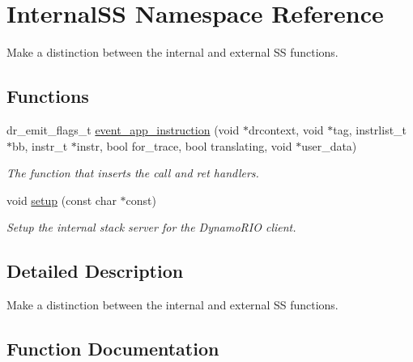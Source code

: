 \hypertarget{namespace_internal_s_s}{}\section{Internal\+SS Namespace Reference}
\label{namespace_internal_s_s}


Make a distinction between the internal and external SS functions.  


\subsection*{Functions}
\begin{DoxyCompactItemize}
\item 
dr\+\_\+emit\+\_\+flags\+\_\+t \hyperlink{namespace_internal_s_s_af5fff02fcf86ee0fd0134fc412c128bc}{event\+\_\+app\+\_\+instruction} (void $\ast$drcontext, void $\ast$tag, instrlist\+\_\+t $\ast$bb, instr\+\_\+t $\ast$instr, bool for\+\_\+trace, bool translating, void $\ast$user\+\_\+data)
\begin{DoxyCompactList}\small\item\em The function that inserts the call and ret handlers. \end{DoxyCompactList}\item 
void \hyperlink{namespace_internal_s_s_a91c77a886d93d8526bf619cb3eeeec6c}{setup} (const char $\ast$const)
\begin{DoxyCompactList}\small\item\em Setup the internal stack server for the Dynamo\+R\+IO client. \end{DoxyCompactList}\end{DoxyCompactItemize}


\subsection{Detailed Description}
Make a distinction between the internal and external SS functions. 

\subsection{Function Documentation}
